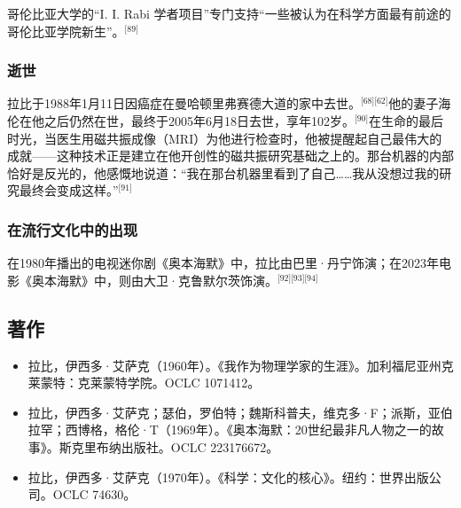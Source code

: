 哥伦比亚大学的“I. I. Rabi 学者项目”专门支持“一些被认为在科学方面最有前途的哥伦比亚学院新生”。\(^\text{[89]}\)
\subsubsection{逝世}
拉比于1988年1月11日因癌症在曼哈顿里弗赛德大道的家中去世。\(^\text{[68][62]}\)他的妻子海伦在他之后仍然在世，最终于2005年6月18日去世，享年102岁。\(^\text{[90]}\)在生命的最后时光，当医生用磁共振成像（MRI）为他进行检查时，他被提醒起自己最伟大的成就——这种技术正是建立在他开创性的磁共振研究基础之上的。那台机器的内部恰好是反光的，他感慨地说道：“我在那台机器里看到了自己……我从没想过我的研究最终会变成这样。”\(^\text{[91]}\)
\subsubsection{在流行文化中的出现}
在1980年播出的电视迷你剧《奥本海默》中，拉比由巴里·丹宁饰演；在2023年电影《奥本海默》中，则由大卫·克鲁默尔茨饰演。\(^\text{[92][93][94]}\)
\subsection{著作}
\begin{itemize}
\item 拉比，伊西多·艾萨克（1960年）。《我作为物理学家的生涯》。加利福尼亚州克莱蒙特：克莱蒙特学院。OCLC 1071412。
\item 拉比，伊西多·艾萨克；瑟伯，罗伯特；魏斯科普夫，维克多·F；派斯，亚伯拉罕；西博格，格伦·T（1969年）。《奥本海默：20世纪最非凡人物之一的故事》。斯克里布纳出版社。OCLC 223176672。
\item 拉比，伊西多·艾萨克（1970年）。《科学：文化的核心》。纽约：世界出版公司。OCLC 74630。
\end{itemize}

